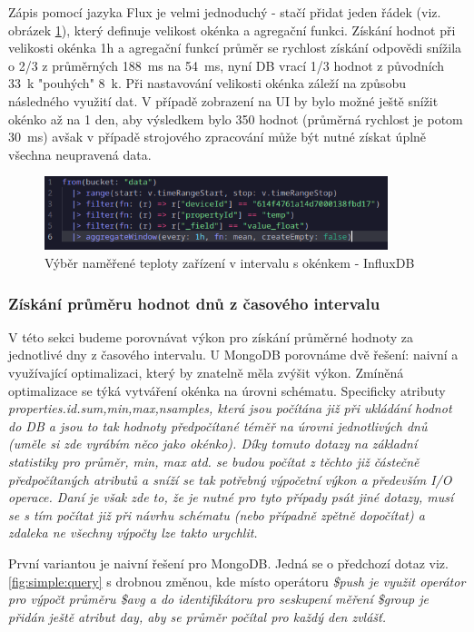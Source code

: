 \documentclass{article}
\begin{document}
Zápis pomocí jazyka Flux je velmi jednoduchý - stačí přidat jeden řádek (viz. obrázek \ref{graf:simple:query:window}), který definuje velikost okénka a agregační funkci. Získání hodnot při velikosti okénka 1h a agregační funkcí průměr se rychlost získání odpovědi snížila o 2/3 z průměrných 188~ms na 54~ms, nyní DB vrací 1/3 hodnot z původních 33~k "pouhých" 8~k. Při nastavování velikosti okénka záleží na způsobu následného využití dat. V případě zobrazení na UI by bylo možné ještě snížit okénko až na 1 den, aby výsledkem bylo 350 hodnot (průměrná rychlost je potom 30~ms) avšak v případě strojového zpracování může být nutné získat úplně všechna neupravená data.
\begin{figure}[htbp]
\includegraphics[width=10cm]{images/simple_query_window.png}
\centering 
\caption{Výběr naměřené teploty zařízení v intervalu s okénkem - InfluxDB\label{graf:simple:query:window}} 
\end{figure}



\subsubsection{Získání průměru hodnot dnů z časového intervalu}
V této sekci budeme porovnávat výkon pro získání průměrné hodnoty za jednotlivé dny z časového intervalu. U MongoDB porovnáme dvě řešení: naivní a využívající optimalizaci, který by znatelně měla zvýšit výkon. Zmíněná optimalizace se týká vytváření okénka na úrovni schématu. Specificky atributy \it{properties.{id}.sum,min,max,nsamples}, která jsou počítána již při ukládání hodnot do DB a jsou to tak hodnoty předpočítané  téměř na úrovni jednotlivých dnů (uměle si zde vyrábím něco jako okénko). Díky tomuto dotazy na základní statistiky pro průměr, min, max atd. se budou počítat z těchto již částečně předpočítaných atributů a sníží se tak potřebný výpočetní výkon a především I/O operace. Daní je však zde to, že je nutné pro tyto případy psát jiné dotazy, musí se s tím počítat již při návrhu schématu (nebo případně zpětně dopočítat) a zdaleka ne všechny výpočty lze takto urychlit.

První variantou je naivní řešení pro MongoDB. Jedná se o předchozí dotaz viz. \ref{fig:simple:query} s drobnou změnou, kde místo operátoru \it{\$push} je využit operátor pro výpočt průměru \it{\$avg} a do identifikátoru pro seskupení měření \it{\$group} je přidán ještě atribut \it{day}, aby se průměr počítal pro každý den zvlášť.
\end{document}
